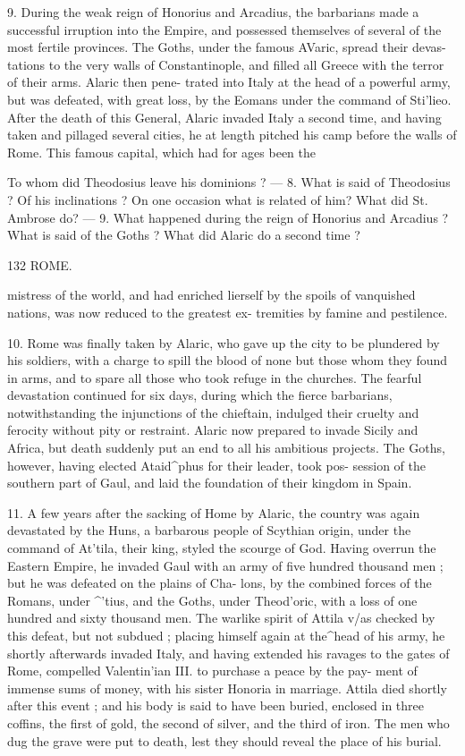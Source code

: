 \documentclass[openany,a4paper]{memoir}
\begin{document}
9. During the weak reign of Honorius and Arcadius, the 
barbarians made a successful irruption into the Empire, and 
possessed themselves of several of the most fertile provinces. 
The Goths, under the famous AVaric, spread their devas- 
tations to the very walls of Constantinople, and filled all 
Greece with the terror of their arms. Alaric then pene- 
trated into Italy at the head of a powerful army, but was 
defeated, with great loss, by the Eomans under the command 
of Sti'lieo. After the death of this General, Alaric invaded 
Italy a second time, and having taken and pillaged several 
cities, he at length pitched his camp before the walls of 
Rome. This famous capital, which had for ages been the 



To whom did Theodosius leave his dominions ? — 8. What is said of 
Theodosius ? Of his inclinations ? On one occasion what is related of 
him? What did St. Ambrose do? — 9. What happened during the 
reign of Honorius and Arcadius ? What is said of the Goths ? What 
did Alaric do a second time ? 



132 ROME. 

mistress of the world, and had enriched lierself by the spoils 
of vanquished nations, was now reduced to the greatest ex- 
tremities by famine and pestilence. 

10. Rome was finally taken by Alaric, who gave up the 
city to be plundered by his soldiers, with a charge to spill 
the blood of none but those whom they found in arms, and to 
spare all those who took refuge in the churches. The fearful 
devastation continued for six days, during which the fierce 
barbarians, notwithstanding the injunctions of the chieftain, 
indulged their cruelty and ferocity without pity or restraint. 
Alaric now prepared to invade Sicily and Africa, but death 
suddenly put an end to all his ambitious projects. The Goths, 
however, having elected Ataid^phus for their leader, took pos- 
session of the southern part of Gaul, and laid the foundation 
of their kingdom in Spain. 

11. A few years after the sacking of Home by Alaric, the 
country was again devastated by the Huns, a barbarous people 
of Scythian origin, under the command of At'tila, their king, 
styled the scourge of God. Having overrun the Eastern 
Empire, he invaded Gaul with an army of five hundred 
thousand men ; but he was defeated on the plains of Cha- 
lons, by the combined forces of the Romans, under ^'tius, 
and the Goths, under Theod'oric, with a loss of one hundred 
and sixty thousand men. The warlike spirit of Attila v/as 
checked by this defeat, but not subdued ; placing himself 
again at the^head of his army, he shortly afterwards invaded 
Italy, and having extended his ravages to the gates of Rome, 
compelled Valentin'ian III. to purchase a peace by the pay- 
ment of immense sums of money, with his sister Honoria 
in marriage. Attila died shortly after this event ; and his 
body is said to have been buried, enclosed in three coffins, 
the first of gold, the second of silver, and the third of iron. 
The men who dug the grave were put to death, lest they 
should reveal the place of his burial. 
\end{document}
